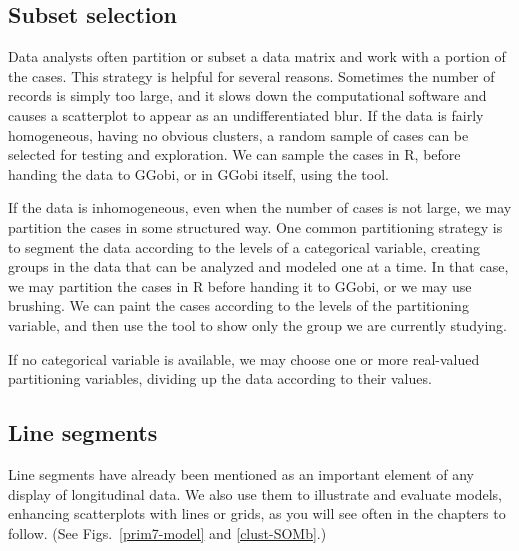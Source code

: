 
\subsection{Subset selection}

Data analysts often partition or subset a data matrix and work with a
portion of the cases.  This strategy is helpful for several reasons.
Sometimes the number of records is simply too large, and it slows down
the computational software and causes a scatterplot to appear as an
undifferentiated blur.  If the data is fairly homogeneous, having no
obvious clusters, a random sample of cases can be selected for testing
and exploration.  We can sample the cases in R, before handing the
data to GGobi, or in GGobi itself, using the  tool.

If the data is inhomogeneous, even when the number of cases is not
large, we may partition the cases in some structured way.  One common
partitioning strategy is to segment the data according to the levels
of a categorical variable, creating groups in the data that can be
analyzed and modeled one at a time.  In that case, we may partition
the cases in R before handing it to GGobi, or we may use brushing.  We
can paint the cases according to the levels of the partitioning
variable, and then use the  tool to
show only the group we are currently studying.

If no categorical variable is available, we may choose one or more
real-valued partitioning variables, dividing up the data according
to their values.

\subsection{Line segments}

Line segments have already been mentioned as an important element of
any display of longitudinal data.  We also use them to illustrate and
evaluate models, enhancing scatterplots with lines or grids, as you
will see often in the chapters to follow.  (See
Figs.~\ref{prim7-model} and \ref{clust-SOMb}.)


